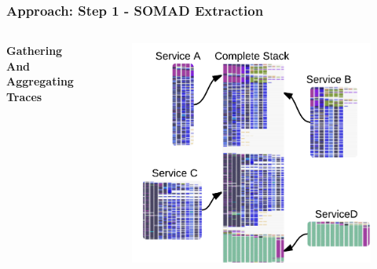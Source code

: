\documentclass{beamer}
\begin{document}
\begin{frame}
\frametitle{Approach: Step 1 - SOMAD Extraction}


\begin{columns}[c] 
\textbf{Gathering And Aggregating Traces \cite{p3}}

\begin{figure}
\includegraphics[width=1\linewidth]{media/SOMAD4-1.png}
\end{figure}




\end{columns}
\end{frame}
\end{document}
